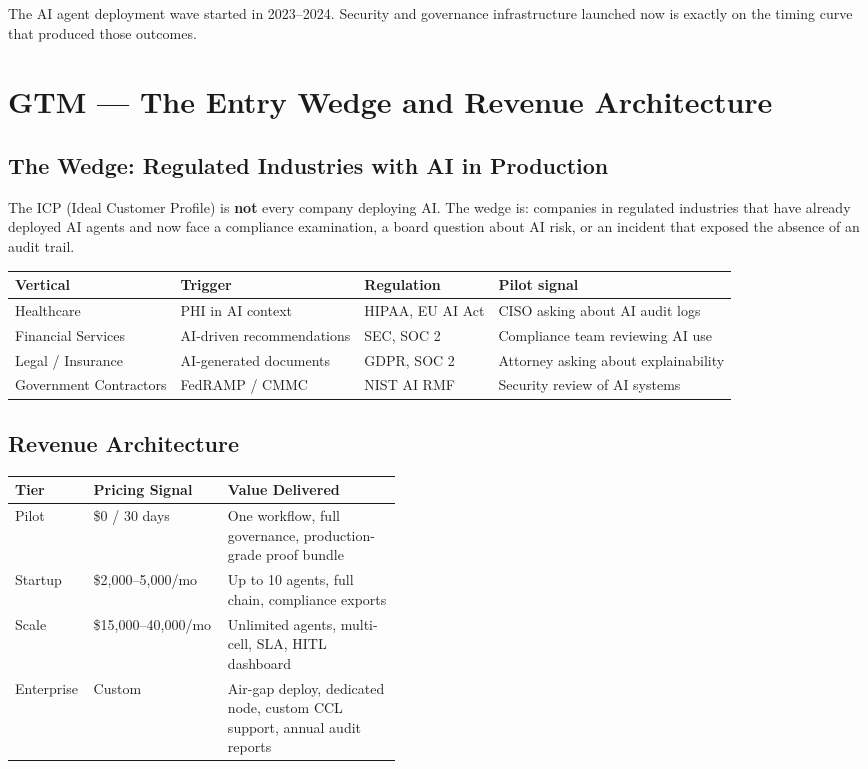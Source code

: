 \documentclass[11pt,a4paper]{article}
\begin{document}
The AI agent deployment wave started in 2023--2024. Security and governance infrastructure
launched now is exactly on the timing curve that produced those outcomes.

\clearpage

\section{GTM — The Entry Wedge and Revenue Architecture}
\label{sec:gtm}

\subsection{The Wedge: Regulated Industries with AI in Production}

The ICP (Ideal Customer Profile) is \textbf{not} every company deploying AI.
The wedge is: companies in regulated industries that have already deployed AI agents
and now face a compliance examination, a board question about AI risk, or an incident
that exposed the absence of an audit trail.

\begin{center}
\small
\begin{tabular}{@{}llll@{}}
\toprule
\textbf{Vertical} & \textbf{Trigger} & \textbf{Regulation} & \textbf{Pilot signal} \\
\midrule
Healthcare & PHI in AI context & HIPAA, EU AI Act & CISO asking about AI audit logs \\
Financial Services & AI-driven recommendations & SEC, SOC 2 & Compliance team reviewing AI use \\
Legal / Insurance & AI-generated documents & GDPR, SOC 2 & Attorney asking about explainability \\
Government Contractors & FedRAMP / CMMC & NIST AI RMF & Security review of AI systems \\
\bottomrule
\end{tabular}
\end{center}

\subsection{Revenue Architecture}

\begin{center}
\small
\begin{tabular}{@{}llp{0.45\linewidth}@{}}
\toprule
\textbf{Tier} & \textbf{Pricing Signal} & \textbf{Value Delivered} \\
\midrule
Pilot & \$0 / 30 days & One workflow, full governance, production-grade proof bundle \\
Startup & \$2{,}000--5{,}000/mo & Up to 10 agents, full chain, compliance exports \\
Scale & \$15{,}000--40{,}000/mo & Unlimited agents, multi-cell, SLA, HITL dashboard \\
Enterprise & Custom & Air-gap deploy, dedicated node, custom CCL support, annual audit reports \\
\bottomrule
\end{tabular}
\end{center}
\end{document}
